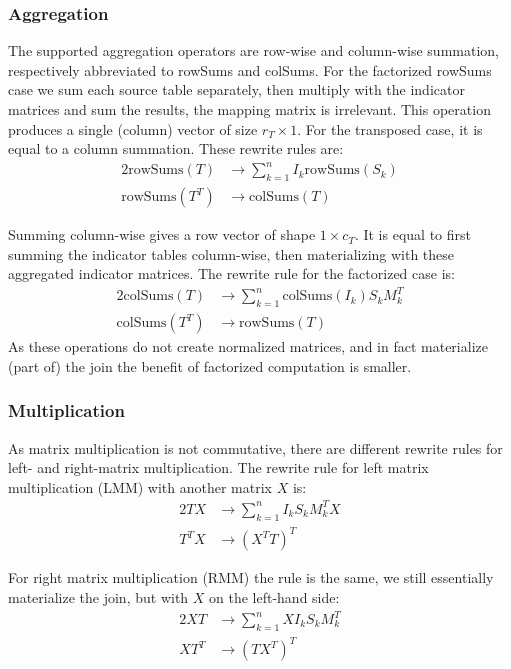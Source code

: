 \subsubsection{Aggregation}
The supported aggregation operators are row-wise and column-wise summation, respectively abbreviated to rowSums and colSums. For the factorized rowSums case we sum each source table separately, then multiply with the indicator matrices and sum the results, the mapping matrix is irrelevant. This operation produces a single (column) vector of size $r_T \times 1$. For the transposed case, it is equal to a column summation. These rewrite rules are:
\begin{alignat*}{2}
  \text{rowSums}(T)   & \rightarrow \sum_{k=1}^n I_k \text{rowSums}(S_k) \\
  \text{rowSums}(T^T) & \rightarrow \text{colSums}(T)
\end{alignat*}

Summing column-wise gives a row vector of shape $1 \times c_T$. It is equal to first summing the indicator tables column-wise, then materializing with these aggregated indicator matrices.  The rewrite rule for the factorized case is:
\begin{alignat*}{2}
  \text{colSums}(T)   & \rightarrow \sum_{k=1}^n \text{colSums}(I_k) S_k M_k^T \\
  \text{colSums}(T^T) & \rightarrow \text{rowSums}(T)
\end{alignat*}
As these operations do not create normalized matrices, and in fact materialize (part of) the join the benefit of factorized computation is smaller.

\subsubsection{Multiplication}
As matrix multiplication is not commutative, there are different rewrite rules for left- and right-matrix multiplication. The rewrite rule for left matrix multiplication (LMM) with another matrix $X$ is:
\begin{alignat*}{2}
  TX   & \rightarrow \sum_{k=1}^n I_k S_k M_k^T X \\
  T^TX & \rightarrow (X^TT)^T
\end{alignat*}

For right matrix multiplication (RMM) the rule is the same, we still essentially materialize the join, but with $X$ on the left-hand side:
\begin{alignat*}{2}
  XT   & \rightarrow \sum_{k=1}^n X I_k S_k M_k^T \\
  XT^T & \rightarrow (TX^T)^T
\end{alignat*}

